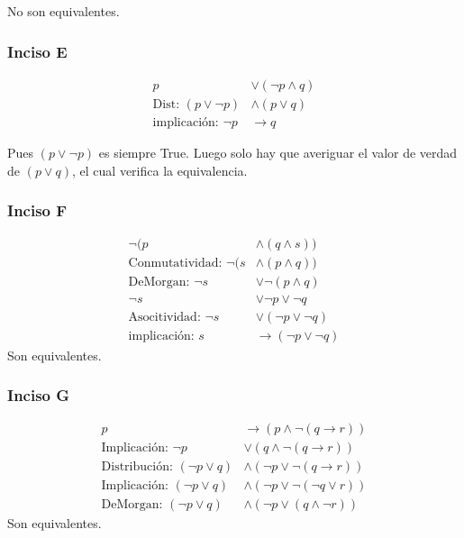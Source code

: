 No son equivalentes.

\subsubsection{Inciso E}

\begin{align*}
    p &\vee (\neg p \wedge q)\\
    \text{Dist: }(p \vee \neg p) &\wedge (p \vee q) \\
    \text{implicación: }\neg p &\rightarrow q
\end{align*}

Pues $(p \vee \neg p)$ es siempre True. Luego solo hay que averiguar el valor de verdad de $(p \vee q)$, el cual verifica
la equivalencia.

\subsubsection{Inciso F}

\begin{align*}
    \neg (p &\wedge (q \wedge s)) \\
    \text{Conmutatividad: }\neg (s &\wedge (p \wedge q)) \\
    \text{DeMorgan: }\neg s &\vee \neg (p\wedge q) \\
    \neg s &\vee \neg p \vee \neg q \\
    \text{Asocitividad: }\neg s &\vee (\neg p \vee \neg q) \\
    \text{implicación: }s &\rightarrow (\neg p \vee \neg q)
\end{align*}
Son equivalentes.

\subsubsection{Inciso G}
\begin{align*}
    p &\rightarrow (p \wedge \neg(q \rightarrow r)) \\
    \text{Implicación: } \neg p &\vee (q \wedge \neg (q \rightarrow r))\\
    \text{Distribución: } (\neg p \vee q) &\wedge (\neg p \vee \neg (q \rightarrow r))\\ 
    \text{Implicación: } (\neg p \vee q) &\wedge (\neg p \vee \neg (\neg q \vee r))\\
    \text{DeMorgan: } (\neg p \vee q) &\wedge (\neg p \vee (q \wedge \neg r))
\end{align*}
Son equivalentes.

